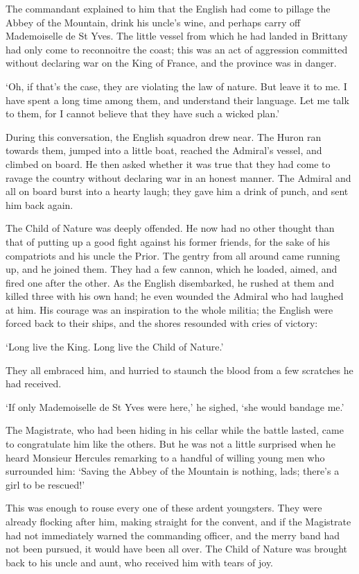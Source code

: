 \documentclass{article}
\begin{document}
\begin{center}
The commandant explained to him that the English had come to pillage the Abbey 
of the Mountain, drink his uncle's wine, and perhaps carry off Mademoiselle de 
St Yves. The little vessel from which he had landed in Brittany had only come to 
reconnoitre the coast; this was an act of aggression committed without declaring 
war on the King of France, and the province was in danger. 

`Oh, if that's the case, they are violating the law of nature. But leave it to 
me. I have spent a long time among them, and understand their language. Let me 
talk to them, for I cannot believe that they have such a wicked plan.' 

During this conversation, the English squadron drew near. The Huron ran towards 
them, jumped into a little boat, reached the Admiral's vessel, and climbed on board. 
He then asked whether it was true that they had come to ravage the country without 
declaring war in an honest manner. The Admiral and all on board burst into a hearty 
laugh; they gave him a drink of punch, and sent him back again. 

The Child of Nature was deeply offended. He now had no other thought than that 
of putting up a good fight against his former friends, for the sake of his compatriots 
and his uncle the Prior. The gentry from all around came running up, and he joined 
them. They had a few cannon, which he loaded, aimed, and fired one after the other. 
As the English disembarked, he rushed at them and killed three with his own hand; 
he even wounded the Admiral who had laughed at him. His courage was an inspiration 
to the whole militia; the English were forced back to their ships, and the shores 
resounded with cries of victory: 

`Long live the King. Long live the Child of Nature.' 

They all embraced him, and hurried to staunch the blood from a few scratches he 
had received. 

`If only Mademoiselle de St Yves were here,' he sighed, `she would bandage me.' 

The Magistrate, who had been hiding in his cellar while the battle lasted, came 
to congratulate him like the others. But he was not a little surprised when he 
heard Monsieur Hercules remarking to a handful of willing young men who surrounded 
him: `Saving the Abbey of the Mountain is nothing, lads; there's a girl to be rescued!' 

This was enough to rouse every one of these ardent youngsters. They were already 
flocking after him, making straight for the convent, and if the Magistrate had 
not immediately warned the commanding officer, and the merry band had not been 
pursued, it would have been all over. The Child of Nature was brought back to his 
uncle and aunt, who received him with tears of joy. 


\end{center}
\end{document}
